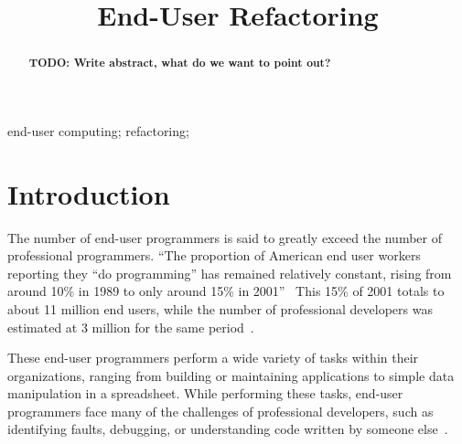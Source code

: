 \documentclass[10pt,conference,compsocconf]{IEEEtran}
\newcommand{\todo}[1]{\textbf{TODO: #1}}
\begin{document}
%
\title{End-User Refactoring}

\author{


\and
{}
}

\maketitle


\begin{abstract}
\todo{Write abstract, what do we want to point out?}
\end{abstract}


\begin{IEEEkeywords}
end-user computing; refactoring; 
\end{IEEEkeywords}

\section{Introduction}
The number of end-user programmers is said to greatly exceed the number of professional programmers. ``The proportion of American end user workers reporting they ``do programming'' has remained relatively constant, rising from around 10\% in 1989 to only around 15\% in 2001''~\cite{Scaf2005} This 15\% of 2001 totals to about 11 million end users, while the number of professional developers was estimated at 3 million for the same period~\cite{Scaf2005}.

These end-user programmers perform a wide variety of tasks within their organizations, ranging from building or maintaining applications to simple data manipulation in a spreadsheet. While performing these tasks, end-user programmers face many of the challenges of professional developers, such as identifying faults, debugging, or understanding code written by someone else~\cite{Ko2011}.
\end{document}
